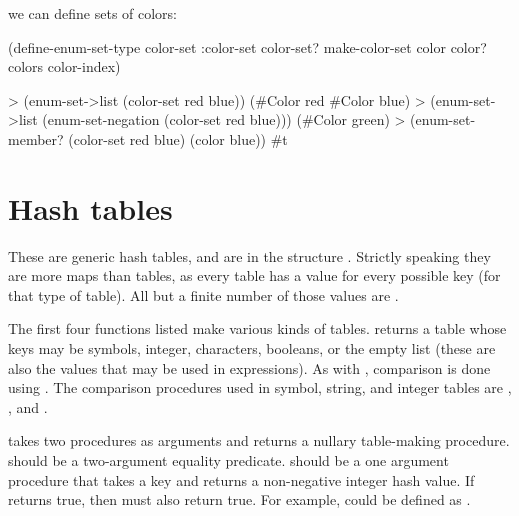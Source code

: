 we can define sets of colors:

\begin{example}
(define-enum-set-type color-set :color-set
                      color-set?
                      make-color-set
  color color? colors color-index)
\end{example}

\begin{example}
> (enum-set->list (color-set red blue))
(#{Color red} #{Color blue})
> (enum-set->list (enum-set-negation (color-set red blue)))
(#{Color green})
> (enum-set-member? (color-set red blue) (color blue))
#t
\end{example}

\section{Hash tables}

These are generic hash tables, and are in the structure .
Strictly speaking they are more maps than tables, as every table has a
 value for every possible key (for that type of table).
All but a finite number of those values are .

\begin{protos}
\end{protos}
\noindent
The first four functions listed make various kinds of tables.
 returns a table whose keys may be symbols, integer,
 characters, booleans, or the empty list (these are also the values
 that may be used in  expressions).
As with , comparison is done using .
The comparison procedures used in symbol, string, and integer tables are
 , , and \code{=}.

 takes two procedures as arguments and returns
 a nullary table-making procedure.
 should be a two-argument equality predicate.
 should be a one argument procedure that takes a key
 and returns a non-negative integer hash value.
If  returns true,
 then 
 must also return true.
For example,  could be defined
 as .

